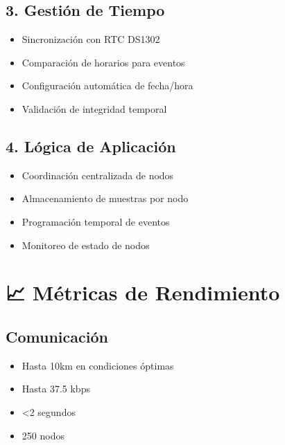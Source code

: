\documentclass[a4paper,11pt,spanish]{sphinxmanual}
\begin{document}
\section{3. Gestión de Tiempo}
\label{\detokenize{index:gestion-de-tiempo}}\begin{itemize}
\item {} 
\sphinxAtStartPar
Sincronización con RTC DS1302

\item {} 
\sphinxAtStartPar
Comparación de horarios para eventos

\item {} 
\sphinxAtStartPar
Configuración automática de fecha/hora

\item {} 
\sphinxAtStartPar
Validación de integridad temporal

\end{itemize}


\section{4. Lógica de Aplicación}
\label{\detokenize{index:logica-de-aplicacion}}\begin{itemize}
\item {} 
\sphinxAtStartPar
Coordinación centralizada de nodos

\item {} 
\sphinxAtStartPar
Almacenamiento de muestras por nodo

\item {} 
\sphinxAtStartPar
Programación temporal de eventos

\item {} 
\sphinxAtStartPar
Monitoreo de estado de nodos

\end{itemize}


\chapter{📈 Métricas de Rendimiento}
\label{\detokenize{index:metricas-de-rendimiento}}

\section{Comunicación}
\label{\detokenize{index:comunicacion}}\begin{itemize}
\item {} 
\sphinxAtStartPar
{} Hasta 10km en condiciones óptimas

\item {} 
\sphinxAtStartPar
{} Hasta 37.5 kbps

\item {} 
\sphinxAtStartPar
{} <2 segundos

\item {} 
\sphinxAtStartPar
{} 250 nodos

\end{itemize}
\end{document}
